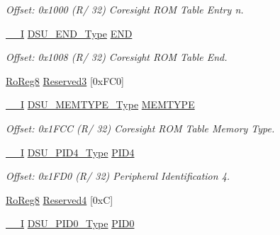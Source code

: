 \begin{DoxyCompactItemize}
\begin{DoxyCompactList}\small\item\em Offset\+: 0x1000 (R/ 32) Coresight R\+OM Table Entry n. \end{DoxyCompactList}\item 
\mbox{\hyperlink{core__cm0plus_8h_af63697ed9952cc71e1225efe205f6cd3}{\+\_\+\+\_\+I}} \mbox{\hyperlink{union_d_s_u___e_n_d___type}{D\+S\+U\+\_\+\+E\+N\+D\+\_\+\+Type}} \mbox{\hyperlink{struct_dsu_a4091fe3b88164b1682ee02daeb49c62a}{E\+ND}}
\begin{DoxyCompactList}\small\item\em Offset\+: 0x1008 (R/ 32) Coresight R\+OM Table End. \end{DoxyCompactList}\item 
\mbox{\hyperlink{group___s_a_m_d21_e15_a__definitions_ga0d957f1433aaf5d70e4dc2b68288442d}{Ro\+Reg8}} \mbox{\hyperlink{struct_dsu_ababa6cb5a34643305b6839c2ac1d5ed8}{Reserved3}} \mbox{[}0x\+F\+C0\mbox{]}
\item 
\mbox{\hyperlink{core__cm0plus_8h_af63697ed9952cc71e1225efe205f6cd3}{\+\_\+\+\_\+I}} \mbox{\hyperlink{union_d_s_u___m_e_m_t_y_p_e___type}{D\+S\+U\+\_\+\+M\+E\+M\+T\+Y\+P\+E\+\_\+\+Type}} \mbox{\hyperlink{struct_dsu_a795f2b9189e004c3d638ee9c0c36232b}{M\+E\+M\+T\+Y\+PE}}
\begin{DoxyCompactList}\small\item\em Offset\+: 0x1\+F\+CC (R/ 32) Coresight R\+OM Table Memory Type. \end{DoxyCompactList}\item 
\mbox{\hyperlink{core__cm0plus_8h_af63697ed9952cc71e1225efe205f6cd3}{\+\_\+\+\_\+I}} \mbox{\hyperlink{union_d_s_u___p_i_d4___type}{D\+S\+U\+\_\+\+P\+I\+D4\+\_\+\+Type}} \mbox{\hyperlink{struct_dsu_aad07c9f8931eb7916a9d7db486e7a1f9}{P\+I\+D4}}
\begin{DoxyCompactList}\small\item\em Offset\+: 0x1\+F\+D0 (R/ 32) Peripheral Identification 4. \end{DoxyCompactList}\item 
\mbox{\hyperlink{group___s_a_m_d21_e15_a__definitions_ga0d957f1433aaf5d70e4dc2b68288442d}{Ro\+Reg8}} \mbox{\hyperlink{struct_dsu_af3a36aca215654d294560ffdd73e40b3}{Reserved4}} \mbox{[}0x\+C\mbox{]}
\item 
\mbox{\hyperlink{core__cm0plus_8h_af63697ed9952cc71e1225efe205f6cd3}{\+\_\+\+\_\+I}} \mbox{\hyperlink{union_d_s_u___p_i_d0___type}{D\+S\+U\+\_\+\+P\+I\+D0\+\_\+\+Type}} \mbox{\hyperlink{struct_dsu_a522c107da63b44519cdbbdd30f0b9b44}{P\+I\+D0}}

\end{DoxyCompactItemize}
